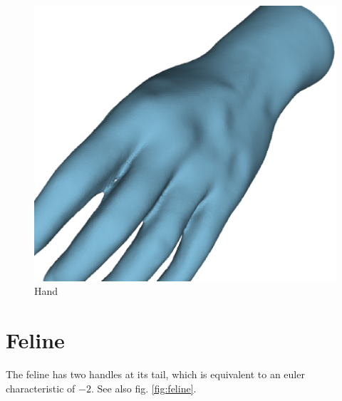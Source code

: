 \documentclass[a4paper,10pt,notitlepage]{scrreprt}
\begin{document}
\begin{figure}
  \centering

  \includegraphics[scale=0.5]{hand.eps}

  \caption{Hand}
  \label{fig:hand}
\end{figure}

\section{Feline}

The feline has two handles at its tail, which is equivalent to an euler
characteristic of $-2$. See also fig. \ref{fig:feline}.
\end{document}

